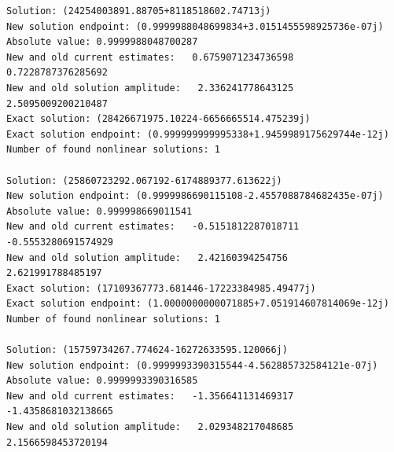 \documentclass{article}
\begin{document}
\begin{verbatim}
Solution: (24254003891.88705+8118518602.74713j)
New solution endpoint: (0.9999988048699834+3.0151455598925736e-07j) Absolute value: 0.9999988048700287
New and old current estimates:   0.6759071234736598    0.7228787376285692
New and old solution amplitude:   2.336241778643125    2.5095009200210487
Exact solution: (28426671975.10224-6656665514.475239j)
Exact solution endpoint: (0.999999999995338+1.9459989175629744e-12j)
Number of found nonlinear solutions: 1

Solution: (25860723292.067192-6174889377.613622j)
New solution endpoint: (0.9999986690115108-2.4557088784682435e-07j) Absolute value: 0.999998669011541
New and old current estimates:   -0.5151812287018711    -0.5553280691574929
New and old solution amplitude:   2.42160394254756    2.621991788485197
Exact solution: (17109367773.681446-17223384985.49477j)
Exact solution endpoint: (1.0000000000071885+7.051914607814069e-12j)
Number of found nonlinear solutions: 1

Solution: (15759734267.774624-16272633595.120066j)
New solution endpoint: (0.9999993390315544-4.562885732584121e-07j) Absolute value: 0.9999993390316585
New and old current estimates:   -1.356641131469317    -1.4358681032138665
New and old solution amplitude:   2.029348217048685    2.1566598453720194

\end{verbatim}
\end{document}
